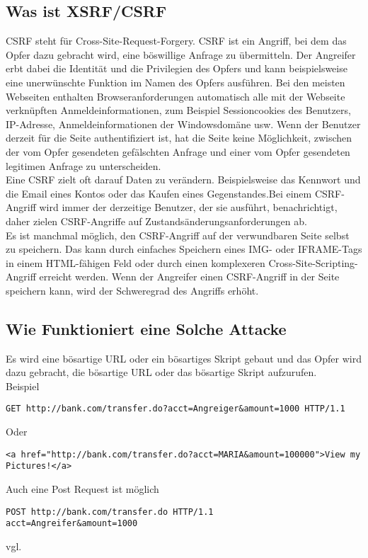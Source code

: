 {\subsection{Was ist XSRF/CSRF}
\label{sec:xsrf_what}
CSRF steht für Cross-Site-Request-Forgery. CSRF ist ein Angriff, bei dem das Opfer dazu gebracht wird, eine böswillige Anfrage zu übermitteln. Der Angreifer erbt dabei die Identität und die Privilegien des Opfers und kann beispielsweise eine unerwünschte Funktion im Namen des Opfers ausführen. Bei den meisten Webseiten enthalten Browseranforderungen automatisch alle mit der Webseite verknüpften Anmeldeinformationen, zum Beispiel Sessioncookies des Benutzers, IP-Adresse, Anmeldeinformationen der Windowsdomäne usw. Wenn der Benutzer derzeit für die Seite authentifiziert ist, hat die Seite keine Möglichkeit, zwischen der vom Opfer gesendeten gefälschten Anfrage und einer vom Opfer gesendeten legitimen Anfrage zu unterscheiden.
\\
Eine CSRF zielt oft darauf Daten zu verändern. Beispielsweise das Kennwort und die Email eines Kontos oder das Kaufen eines Gegenstandes.Bei einem CSRF-Angriff wird immer der derzeitige Benutzer, der sie ausführt, benachrichtigt, daher zielen CSRF-Angriffe auf Zustandsänderungsanforderungen ab.
\\
Es ist manchmal möglich, den CSRF-Angriff auf der verwundbaren Seite selbst zu speichern. Das kann durch einfaches Speichern eines IMG- oder IFRAME-Tags in einem HTML-fähigen Feld oder durch einen komplexeren Cross-Site-Scripting-Angriff erreicht werden. Wenn der Angreifer einen CSRF-Angriff in der Seite speichern kann, wird der Schweregrad des Angriffs erhöht. 
\subsection{Wie Funktioniert eine Solche Attacke}
\label{sec:xsrf_how}
Es wird eine bösartige URL oder ein bösartiges Skript gebaut und das Opfer wird dazu gebracht, die bösartige URL oder das bösartige Skript aufzurufen. 
\\
Beispiel
\begin{lstlisting}
GET http://bank.com/transfer.do?acct=Angreiger&amount=1000 HTTP/1.1
\end{lstlisting}
Oder
\begin{lstlisting}
<a href="http://bank.com/transfer.do?acct=MARIA&amount=100000">View my Pictures!</a>
\end{lstlisting}
Auch eine Post Request ist möglich
\\
\begin{lstlisting}
POST http://bank.com/transfer.do HTTP/1.1
acct=Angreifer&amount=1000
\end{lstlisting}
vgl. \textcite{CSRF}
}

